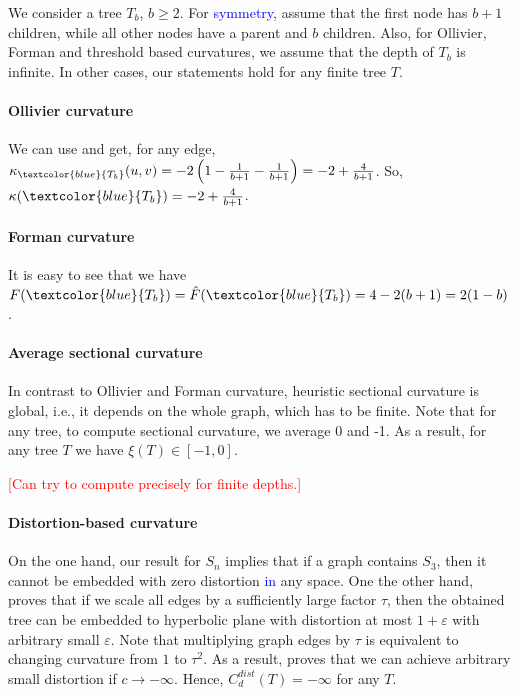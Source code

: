 \documentclass{article} %
\newcommand{\ph}[1]{\textcolor{blue}{#1}}
\begin{document}
We consider a tree $T_b$, $b \ge 2$. For \ph{symmetry}, assume that the first node has $b+1$ children, while all other nodes have a parent and $b$ children. Also, for Ollivier, Forman and threshold based curvatures, we assume that the depth of $T_b$ is infinite. In other cases, our statements hold for any finite tree $T$.

\paragraph{Ollivier curvature} We can use  and get, for any edge,
$\kappa_{\ph{T_b}}(u,v) = -2 \left(1 - \frac{1}{b+1} - \frac{1}{b+1} \right) = - 2 + \frac{4}{b+1}$. So, $\kappa(\ph{T_b}) = -2 + \frac{4}{b+1}$.

\paragraph{Forman curvature} 
It is easy to see that we have 
$F(\ph{T_b}) = \hat F(\ph{T_b}) = 4 - 2(b+1) = 2(1-b)$.


\paragraph{Average sectional curvature} In contrast to Ollivier and Forman curvature, heuristic sectional curvature is global, i.e., it depends on the whole graph, which has to be finite. Note that for any tree, to compute sectional curvature, we average 0 and -1. As a result, for any tree $T$ we have $\xi(T) \in [-1,0]$. 

\textcolor{red}{[Can try to compute precisely for finite depths.]}

\paragraph{Distortion-based curvature} 

On the one hand, our result for $S_n$ implies that if a graph contains $S_3$, then it cannot be embedded with zero distortion \ph{in} any space. One the other hand, \citet{sarkar2011low} proves that if we scale all edges by a sufficiently large factor $\tau$, then the obtained tree can be embedded to hyperbolic plane with distortion at most $1 + \varepsilon$ with arbitrary small $\varepsilon$. Note that multiplying graph edges by $\tau$ is equivalent to changing curvature from $1$ to $\tau^2$. As a result, \citet{sarkar2011low} proves that we can achieve arbitrary small distortion if $c \to -\infty$.
Hence, $C_d^{dist}(T) = -\infty$ for any $T$.
\end{document}
